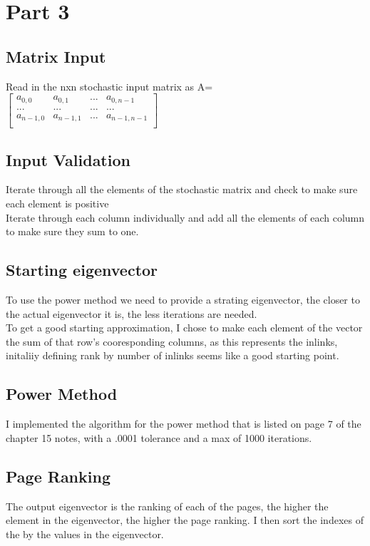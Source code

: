 \documentclass[11pt]{article}
\begin{document}
\section*{Part 3}
\subsection*{Matrix Input}
Read in the nxn stochastic input matrix as A=$
	\begin{bmatrix}
	a_{0,0} & a_{0,1} &...&a_{0,n-1}\\
	...&...&...&...\\
	a_{n-1,0}&a_{n-1,1}&...&a_{n-1,n-1}\\
	\end{bmatrix}$\\


\subsection*{Input Validation}
	Iterate through all the elements of the stochastic matrix and check to make sure each element is positive\\
	Iterate through each column individually and add all the elements of each column to make sure they sum to one.\\
\subsection*{Starting eigenvector}
	To use the power method we need to provide a strating eigenvector, the closer to the actual eigenvector it is, the less iterations are needed. \\

	To get a good starting approximation,  I chose to make each element of the vector the sum of that row's cooresponding columns, as this represents the inlinks, initaliiy defining rank by number of inlinks seems like a good starting point.

\subsection*{Power Method}
	I implemented the algorithm for the power method that is listed on page 7 of the chapter 15 notes,  with a .0001 tolerance and a max of 1000 iterations.

\subsection*{Page Ranking}
	The output eigenvector is the ranking of each of the pages, the higher the element in the eigenvector,  the higher the page ranking. I then sort the indexes of the by the values in the eigenvector.
\end{document}

